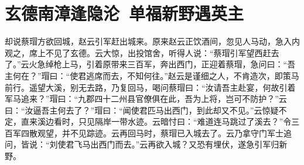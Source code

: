 \chapter{玄德南漳逢隐沦~单福新野遇英主}

却说蔡瑁方欲回城，赵云引军赶出城来。原来赵云正饮酒间，忽见人马动，急入内观之，席上不见了玄德。云大惊，出投馆舍，听得人说：“蔡瑁引军望西赶去了。”云火急绰枪上马，引着原带来三百军，奔出西门，正迎着蔡瑁，急问曰：“吾主何在？”瑁曰：“使君逃席而去，不知何往。”赵云是谨细之人，不肯造次，即策马前行。遥望大溪，别无去路，乃复回马，喝问蔡瑁曰：“汝请吾主赴宴，何故引着军马追来？”瑁曰：“九郡四十二州县官僚俱在此，吾为上将，岂可不防护？”云曰：“汝逼吾主何去了？”瑁曰：“闻使君匹马出西门，到此却又不见。”云惊疑不定，直来溪边看时，只见隔岸一带水迹。云暗忖曰：“难道连马跳过了溪去？”令三百军四散观望，并不见踪迹。云再回马时，蔡瑁已入城去了。云乃拿守门军士追问，皆说：“刘使君飞马出西门而去。”云再欲入城？又恐有埋伏，遂急引军归新野。


